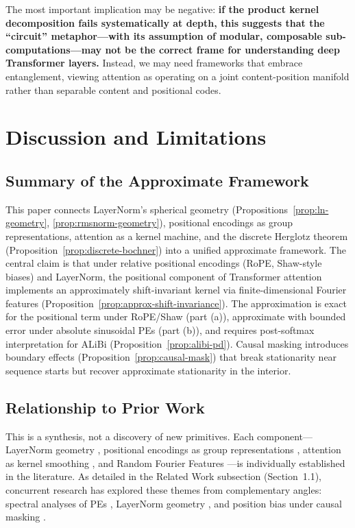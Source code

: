 \documentclass[11pt]{article}
\theoremstyle{definition}
\begin{document}
The most important implication may be negative: \textbf{if the product kernel decomposition fails systematically at depth, this suggests that the ``circuit'' metaphor---with its assumption of modular, composable sub-computations---may not be the correct frame for understanding deep Transformer layers.} Instead, we may need frameworks that embrace entanglement, viewing attention as operating on a joint content-position manifold rather than separable content and positional codes.

\section{Discussion and Limitations}

\subsection{Summary of the Approximate Framework}

This paper connects LayerNorm's spherical geometry (Propositions~\ref{prop:ln-geometry}, \ref{prop:rmsnorm-geometry}), positional encodings as group representations, attention as a kernel machine, and the discrete Herglotz theorem (Proposition~\ref{prop:discrete-bochner}) into a unified approximate framework. The central claim is that under relative positional encodings (RoPE, Shaw-style biases) and LayerNorm, the positional component of Transformer attention implements an approximately shift-invariant kernel via finite-dimensional Fourier features (Proposition~\ref{prop:approx-shift-invariance}). The approximation is exact for the positional term under RoPE/Shaw (part (a)), approximate with bounded error under absolute sinusoidal PEs (part (b)), and requires post-softmax interpretation for ALiBi (Proposition~\ref{prop:alibi-pd}). Causal masking introduces boundary effects (Proposition~\ref{prop:causal-mask}) that break stationarity near sequence starts but recover approximate stationarity in the interior.

\subsection{Relationship to Prior Work}

This is a synthesis, not a discovery of new primitives. Each component---LayerNorm geometry \cite{ba2016layer}, positional encodings as group representations \cite{vaswani2017attention,su2021roformer,lim2024positional,kogkalidis2023algebraic}, attention as kernel smoothing \cite{tsai2019transformer,kashiwagi2021gaussian}, and Random Fourier Features \cite{rahimi2007random}---is individually established in the literature. As detailed in the Related Work subsection (Section~1.1), concurrent research has explored these themes from complementary angles: spectral analyses of PEs \cite{unpacking2025spectral}, LayerNorm geometry \cite{layernorm2024geometry,layernorm2024reintro}, and position bias under causal masking \cite{positionbias2025,clustering2024causal}.
\end{document}
